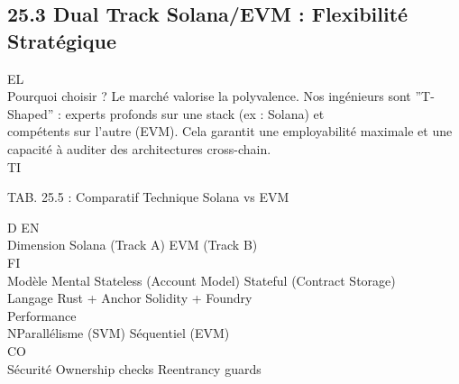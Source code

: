 \documentclass[12pt,landscape,a4paper]{article}
\begin{document}
\subsection{25.3 Dual Track Solana/EVM : Flexibilité Stratégique}
\vspace{0.5em}
\vspace{0.5em}
\vspace{0.5em}
\vspace{0.5em}
EL\\
Pourquoi choisir ? Le marché valorise la polyvalence. Nos ingénieurs sont ”T-Shaped” : experts profonds sur une stack (ex : Solana) et\\
compétents sur l’autre (EVM). Cela garantit une employabilité maximale et une capacité à auditer des architectures cross-chain.\\
\vspace{0.5em}
\vspace{0.5em}
\vspace{0.5em}
\vspace{0.5em}
TI\\
\begin{center}\begin{tabular}TAB. 25.5 : Comparatif Technique Solana vs EVM\end{tabular}\end{center}
\vspace{0.5em}
\vspace{0.5em}
\vspace{0.5em}
\vspace{0.5em}
D   EN\\
Dimension     Solana (Track A)          EVM (Track B)\\
\vspace{0.5em}
\vspace{0.5em}
\vspace{0.5em}
\vspace{0.5em}
FI\\
Modèle Mental Stateless (Account Model) Stateful (Contract Storage)\\
Langage       Rust + Anchor             Solidity + Foundry\\
Performance\\
NParallélisme (SVM)        Séquentiel (EVM)\\
CO\\
Sécurité      Ownership checks          Reentrancy guards\\
\vspace{0.5em}
\vspace{0.5em}
\vspace{0.5em}
\vspace{0.5em}
\end{document}
